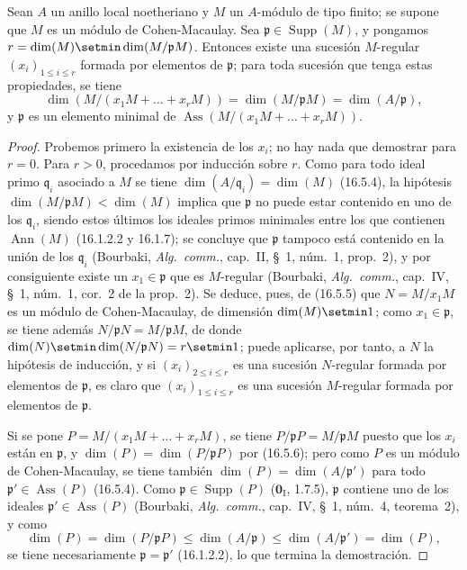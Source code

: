 \begin{proposition}[16.5.9]
\label{0.16.5.9-es}
Sean $A$ un anillo local noetheriano y $M$ un $A$-módulo de tipo finito; se
supone que $M$ es un módulo de Cohen-Macaulay. Sea
$\mathfrak{p}\in\operatorname{Supp}(M)$, y pongamos
$r=\dim(M)\setmin\dim(M/\mathfrak{p}M)$. Entonces existe una sucesión $M$-regular
$(x_i)_{1\leq i\leq r}$ formada por elementos de $\mathfrak{p}$; para toda
sucesión que tenga estas propiedades, se tiene
\[
  \dim(M/(x_1M+\ldots+x_rM))
  =\dim(M/\mathfrak{p}M)=\dim(A/\mathfrak{p}),
\]
y $\mathfrak{p}$ es un elemento minimal de
$\operatorname{Ass}(M/(x_1M+\ldots+x_rM))$.
\end{proposition}

\begin{proof}
Probemos primero la existencia de los $x_i$; no hay nada que demostrar para
$r=0$. Para $r>0$, procedamos por inducción sobre $r$. Como para todo ideal
primo $\mathfrak{q}_i$ asociado a $M$ se tiene
$\dim(A/\mathfrak{q}_i)=\dim(M)$ (16.5.4), la hipótesis
$\dim(M/\mathfrak{p}M)<\dim(M)$ implica que $\mathfrak{p}$ no puede estar
contenido en uno de los $\mathfrak{q}_i$, siendo estos últimos los ideales primos
minimales entre los que contienen $\operatorname{Ann}(M)$ (16.1.2.2 y
16.1.7); se concluye que $\mathfrak{p}$ tampoco está contenido en la
unión de los $\mathfrak{q}_i$ (Bourbaki, \emph{Alg.~comm.}, cap.~II, \S~1,
núm.~1, prop.~2), y por consiguiente existe un $x_1\in\mathfrak{p}$ que es
$M$-regular (Bourbaki, \emph{Alg.~comm.}, cap.~IV, \S~1, núm.~1, cor.~2 de
la prop.~2). Se deduce, pues, de (16.5.5) que $N=M/x_1M$ es un módulo de
Cohen-Macaulay, de dimensión $\dim(M)\setmin 1$; como $x_1\in\mathfrak{p}$, se tiene
además $N/\mathfrak{p}N=M/\mathfrak{p}M$, de donde
$\dim(N)\setmin\dim(N/\mathfrak{p}N)=r\setmin 1$; puede aplicarse, por tanto, a $N$
la hipótesis de inducción, y si $(x_i)_{2\leq i\leq r}$ es una sucesión
$N$-regular formada por elementos de $\mathfrak{p}$, es claro que
$(x_i)_{1\leq i\leq r}$ es una sucesión $M$-regular formada por elementos de
$\mathfrak{p}$.

Si se pone $P=M/(x_1M+\ldots+x_rM)$, se tiene
$P/\mathfrak{p}P=M/\mathfrak{p}M$ puesto que los $x_i$ están en
$\mathfrak{p}$, y $\dim(P)=\dim(P/\mathfrak{p}P)$ por (16.5.6); pero como
$P$ es un módulo de Cohen-Macaulay, se tiene también
$\dim(P)=\dim(A/\mathfrak{p}')$ para todo
$\mathfrak{p}'\in\operatorname{Ass}(P)$ (16.5.4). Como
$\mathfrak{p}\in\operatorname{Supp}(P)$ ($\mathbf{0}_{\mathrm I}$, 1.7.5),
$\mathfrak{p}$ contiene uno de los ideales
$\mathfrak{p}'\in\operatorname{Ass}(P)$ (Bourbaki, \emph{Alg.~comm.},
cap.~IV, \S~1, núm.~4, teorema~2), y como
\[
  \dim(P)=\dim(P/\mathfrak{p}P)
  \leq\dim(A/\mathfrak{p})
  \leq\dim(A/\mathfrak{p}')=\dim(P),
\]
se tiene necesariamente $\mathfrak{p}=\mathfrak{p}'$ (16.1.2.2), lo que
termina la demostración.
\end{proof}

